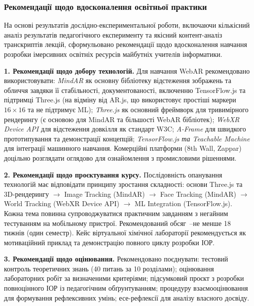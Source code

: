 
\subsubsection{Рекомендації щодо вдосконалення освітньої практики}

На основі результатів дослідно-експериментальної роботи, включаючи кількісний аналіз результатів педагогічного експерименту та якісний контент-аналіз транскриптів лекцій, сформульовано рекомендації щодо вдосконалення навчання розробки імерсивних освітніх ресурсів майбутніх учителів інформатики.

\textbf{1. Рекомендації щодо добору технологій.} Для навчання WebAR рекомендовано використовувати: \textit{MindAR} як основну бібліотеку відстеження зображень та обличчя завдяки її стабільності, документованості, включенню TensorFlow.js та підтримці Three.js (на відміну від AR.js, що використовує простіші маркери $16 \times 16$ та не підтримує ML); \textit{Three.js} як основний фреймворк для тривимірного рендерингу (є основою для MindAR та більшості WebAR бібліотек); \textit{WebXR Device API} для відстеження довкілля як стандарт W3C; \textit{A-Frame} для швидкого прототипування та демонстрації концепцій; \textit{TensorFlow.js та Teachable Machine} для інтеграції машинного навчання. Комерційні платформи (8th Wall, Zappar) доцільно розглядати оглядово для ознайомлення з промисловими рішеннями.

\textbf{2. Рекомендації щодо проєктування курсу.} Послідовність опанування технологій має відповідати принципу зростання складності: основи Three.js та 3D-рендерингу $\to$ Image Tracking (MindAR) $\to$ Face Tracking (MindAR) $\to$ World Tracking (WebXR Device API) $\to$ ML Integration (TensorFlow.js). Кожна тема повинна супроводжуватися практичним завданням з негайним тестуванням на мобільному пристрої. Рекомендований обсяг~--не менше 18 тижнів (один семестр). Кейс віртуальної хімічної лабораторії рекомендується як мотиваційний приклад та демонстрацію повного циклу розробки ІОР.

\textbf{3. Рекомендації щодо оцінювання.} Рекомендовано поєднувати: тестовий контроль теоретичних знань (40 питань за 10 розділами); оцінювання лабораторних робіт за визначеними критеріями; підсумковий проєкт з розробки повноцінного ІОР із педагогічним обґрунтуванням; процедуру взаємооцінювання для формування рефлексивних умінь; есе-рефлексії для аналізу власного досвіду.

